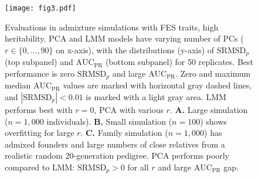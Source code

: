 \documentclass[9pt,lineno]{elife}
\newcommand{\rmsd}{\text{SRMSD}_p}
\newcommand{\auc}{\text{AUC}_\text{PR}}
\begin{document}
\begin{figure}
  \begin{fullwidth}
    \texttt{[image: fig3.pdf]}
    \caption{
      Evaluations in admixture simulations with FES traits, high heritability.
      PCA and LMM models have varying number of PCs ($r \in \{0, ..., 90\}$ on x-axis), with the distributions (y-axis) of $\rmsd$ (top subpanel) and $\auc$ (bottom subpanel) for 50 replicates.
      Best performance is zero $\rmsd$ and large $\auc$.
      Zero and maximum median $\auc$ values are marked with horizontal gray dashed lines, and $|\rmsd| < 0.01$ is marked with a light gray area.
      LMM performs best with $r=0$, PCA with various $r$.
      \textbf{A.}
      Large simulation ($n = 1,000$ individuals).
      \textbf{B.}
      Small simulation ($n = 100$) shows overfitting for large $r$.
      \textbf{C.}
      Family simulation ($n = 1,000$) has admixed founders and large numbers of close relatives from a realistic random 20-generation pedigree.
      PCA performs poorly compared to LMM: $\rmsd > 0$ for all $r$ and large $\auc$ gap.
    }
    \label{fig:rmsd-auc-sim}
    \label{figsupp:rmsd-auc-sim-rc}
    \label{figsupp:rmsd-auc-sim-fes-h3}
    \label{figsupp:rmsd-auc-sim-rc-h3}
    \label{figsupp:rmsd-auc-sim-fes-env}
    \label{figsupp:rmsd-auc-sim-rc-env}
  \end{fullwidth}
\end{figure}
\end{document}
